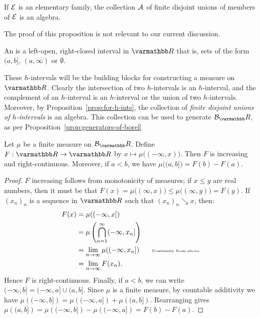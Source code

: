     \begin{proposition}\label{prop:for-h-ints}
        If $\mathcal{E}$ is an elementary family, the collection $\mathcal{A}$ of finite disjoint unions of members of $\mathcal{E}$ is an algebra.
    \end{proposition}

    The proof of this proposition is not relevant to our current discussion.

    \begin{definition}
        An  is a left-open, right-closed interval in $\bfR$ \textemdash that is, sets of the form $(a,b]$, $(a,\infty)$ or $\emptyset$.
    \end{definition}

    These $h$-intervals will be the building blocks for constructing a measure on $\bfR$. Clearly the intersection of two $h$-intervals is an $h$-interval, and the complement of an $h$-interval is an $h$-interval or the union of two $h$-intervals. Moreover, by Proposition~\ref{prop:for-h-ints}, the collection of \textit{finite disjoint unions of $h$-intervals} is an algebra. This collection can be used to generate $\cB_\bfR$, as per Proposition~\ref{prop:generators-of-borel}

    \begin{proposition}\label{prop:distribution-funct}
        Let $\mu$ be a finite measure on $\cB_\bfR$. Define $F:\bfR \rightarrow \bfR$ by $x \mapsto \mu\bigl(   (-\infty,x)\bigr)$. Then $F$ is increasing and right-continuous. Moreover, if $a < b$, we have $\mu \bigl((a,b]\bigr) = F(b) - F(a)$.
    \end{proposition}
        \begin{proof}
            $F$ increasing follows from monotonicity of measures; if $x \leq y$ are real numbers, then it must be that $F(x) = \mu \bigl((\infty,x)\bigr) \leq \mu \bigl((\infty,y)\bigr) = F(y)$. If $(x_n)_n$ is a sequence in $\bfR$ such that $(x_n)_n \searrow x$, then:
                \begin{equation*}
                \begin{split}
                    F(x)
                    & = \mu((-\infty,x]) \\
                    & = \mu \left( \bigcap_{n = 1}^\infty (-\infty,x_n] \right) \\
                    & = \lim_{n \rightarrow \infty} \mu((-\infty,x_n]) \h9\h9\text{\tiny Continuity from above} \\
                    & = \lim_{n \rightarrow \infty} F(x_n).
                \end{split}
                \end{equation*}
            Hence $F$ is right-continuous. Finally, if $a < b$, we can write $(-\infty,b] = (-\infty,a] \cup (a,b]$. Since $\mu$ is a finite measure, by countable additivity we have $\mu \left( (-\infty,b] \right) = \mu \left( (-\infty,a] \right) + \mu \left( (a,b] \right)$. Rearranging gives $\mu \left( (a,b] \right) = \mu \left( (-\infty,b] \right) - \mu \left( (-\infty,a] \right) = F(b) - F(a)$.
        \end{proof}

